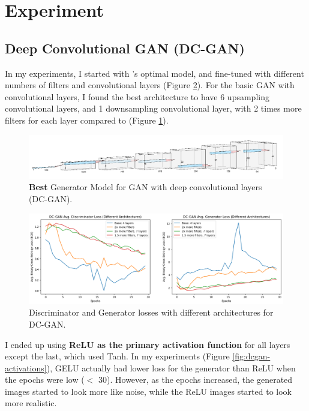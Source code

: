 \documentclass[twoside,11pt]{article}
\begin{document}
\section{Experiment}

\subsection{Deep Convolutional GAN (DC-GAN)}

In my experiments, I started with \citet{radford:16}'s optimal model, and fine-tuned with different numbers of filters and convolutional layers (Figure \ref{fig:dcgan-archs}). For the basic GAN with convolutional layers, I found the best architecture to have 6 upsampling convolutional layers, and 1 downsampling convolutional layer, with 2 times more filters for each layer compared to \citet{radford:16} (Figure \ref{fig:best-dcgan}). 

\begin{figure}[h!]
  \centering
  \includegraphics[width=17cm]{images/dcgan-experiments/dcgan4.png}
  \caption{\textbf{Best} Generator Model for GAN with deep convolutional layers (DC-GAN).}
  \label{fig:best-dcgan}
\end{figure}

\begin{figure}[h!]
  \centering
  \includegraphics[width=16cm]{images/dcgan-experiments/dcgan-archs.png}
  \caption{Discriminator and Generator losses with different architectures for DC-GAN.}
  \label{fig:dcgan-archs}
\end{figure}

I ended up using \textbf{ReLU as the primary activation function} for all layers except the last, which used Tanh. In my experiments (Figure \ref{fig:dcgan-activations}), GELU actually had lower loss for the generator than ReLU when the epochs were low ($<$ 30). However, as the epochs increased, the generated images started to look more like noise, while the ReLU images started to look more realistic. 
\end{document}
